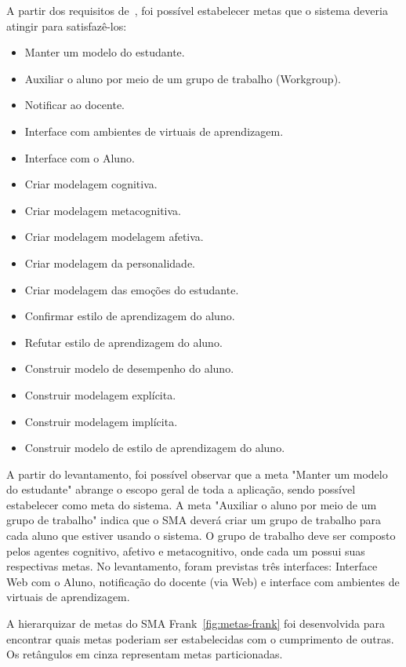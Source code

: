 A partir dos requisitos de~\cite{editalFrank}, foi possível estabelecer metas que o sistema deveria atingir para satisfazê-los:

\begin{itemize}
	\item Manter um modelo do estudante.
	\item Auxiliar o aluno por meio de um grupo de trabalho (Workgroup).
	\item Notificar ao docente.
	\item Interface com ambientes de virtuais de aprendizagem.
	\item Interface com o Aluno.
	\item Criar modelagem cognitiva.
	\item Criar modelagem metacognitiva.
	\item Criar modelagem modelagem afetiva.
	\item Criar modelagem da personalidade.
	\item Criar modelagem das emoções do estudante.
	\item Confirmar estilo de aprendizagem do aluno.
	\item Refutar estilo de aprendizagem do aluno.
	\item Construir modelo de desempenho do aluno.
	\item Construir modelagem explícita.
	\item Construir modelagem implícita.
	\item Construir modelo de estilo de aprendizagem do aluno.
\end{itemize}

A partir do levantamento, foi possível observar que a meta "Manter um modelo do estudante" abrange o escopo geral de toda a aplicação, sendo possível estabelecer como meta do sistema. A meta "Auxiliar o aluno por meio de um grupo de trabalho" indica que o SMA deverá criar um grupo de trabalho para cada aluno que estiver usando o sistema. O grupo de trabalho deve ser composto pelos agentes cognitivo, afetivo e metacognitivo, onde cada um possui suas respectivas metas. No levantamento, foram previstas três interfaces: Interface Web com o Aluno, notificação do docente (via Web) e interface com ambientes de virtuais de aprendizagem.

A hierarquizar de metas do SMA Frank~\ref{fig:metas-frank} foi desenvolvida para encontrar quais metas poderiam ser estabelecidas com o cumprimento de outras. Os retângulos em cinza representam metas particionadas.

